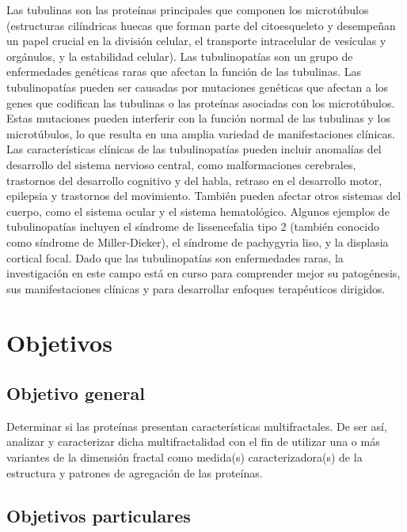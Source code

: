\documentclass[11pt]{article}
\begin{document}
Las tubulinas son las prote\'{i}nas principales que componen los microt\'{u}bulos (estructuras cil\'{i}ndricas huecas que forman parte del citoesqueleto y desempeñan un papel crucial en la divisi\'{o}n celular, el transporte intracelular de ves\'{i}culas y org\'{a}nulos, y la estabilidad celular).
Las tubulinopat\'{i}as son un grupo de enfermedades gen\'{e}ticas raras que afectan la funci\'{o}n de las tubulinas. Las tubulinopat\'{i}as pueden ser causadas por mutaciones gen\'{e}ticas que afectan a los genes que codifican las tubulinas o las prote\'{i}nas asociadas con los microt\'{u}bulos. Estas mutaciones pueden interferir con la funci\'{o}n normal de las tubulinas y los microt\'{u}bulos, lo que resulta en una amplia variedad de manifestaciones cl\'{i}nicas. Las caracter\'{i}sticas cl\'{i}nicas de las tubulinopat\'{i}as pueden incluir anomal\'{i}as del desarrollo del sistema nervioso central, como malformaciones cerebrales, trastornos del desarrollo cognitivo y del habla, retraso en el desarrollo motor, epilepsia y trastornos del movimiento. Tambi\'{e}n pueden afectar otros sistemas del cuerpo, como el sistema ocular y el sistema hematol\'{o}gico. Algunos ejemplos de tubulinopat\'{i}as incluyen el s\'{i}ndrome de lissencefalia tipo 2 (tambi\'{e}n conocido como s\'{i}ndrome de Miller-Dieker), el s\'{i}ndrome de pachygyria liso, y la displasia cortical focal. Dado que las tubulinopat\'{i}as son enfermedades raras, la investigaci\'{o}n en este campo est\'{a} en curso para comprender mejor su patog\'{e}nesis, sus manifestaciones cl\'{i}nicas y para desarrollar enfoques terap\'{e}uticos dirigidos.

\section{Objetivos}
\subsection{Objetivo general}

Determinar si las prote\'{i}nas presentan caracter\'{i}sticas multifractales. De ser as\'{i}, analizar y caracterizar
dicha multifractalidad con el fin de utilizar una o m\'{a}s variantes de la
dimensi\'{o}n fractal como medida(s) caracterizadora(s)
de la estructura y patrones de agregaci\'{o}n de las prote\'{i}nas.


\subsection{Objetivos particulares}
\end{document}
